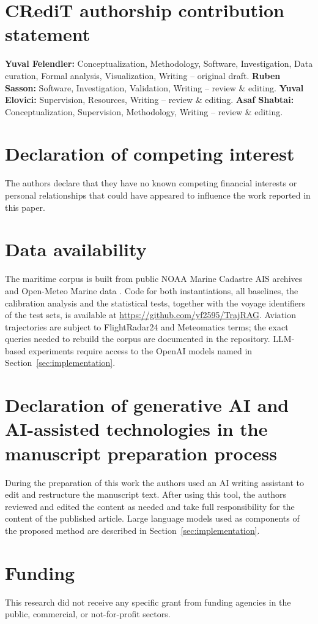 \section*{CRediT authorship contribution statement}
\textbf{Yuval Felendler:} Conceptualization, Methodology, Software,
Investigation, Data curation, Formal analysis, Visualization, Writing --
original draft. \textbf{Ruben Sasson:} Software, Investigation, Validation,
Writing -- review \& editing. \textbf{Yuval Elovici:} Supervision,
Resources, Writing -- review \& editing. \textbf{Asaf Shabtai:}
Conceptualization, Supervision, Methodology, Writing -- review \& editing.

\section*{Declaration of competing interest}
The authors declare that they have no known competing financial interests
or personal relationships that could have appeared to influence the work
reported in this paper.

\section*{Data availability}
The maritime corpus is built from public NOAA Marine Cadastre AIS archives
\citep{noaa2025marinecadastre} and Open-Meteo Marine data
\citep{openmeteo2025}. Code for both instantiations, all baselines, the
calibration analysis and the statistical tests, together with the voyage
identifiers of the test sets, is available at
\url{https://github.com/yf2595/TrajRAG}. Aviation trajectories are subject
to FlightRadar24 and Meteomatics terms; the exact queries needed to rebuild
the corpus are documented in the repository. LLM-based experiments require
access to the OpenAI models named in Section~\ref{sec:implementation}.

\section*{Declaration of generative AI and AI-assisted technologies in the
manuscript preparation process}
During the preparation of this work the authors used an AI writing
assistant to edit and restructure the manuscript text. After using this
tool, the authors reviewed and edited the content as needed and take full
responsibility for the content of the published article. Large language
models used as components of the proposed method are described in
Section~\ref{sec:implementation}.

\section*{Funding}
This research did not receive any specific grant from funding agencies in
the public, commercial, or not-for-profit sectors.
